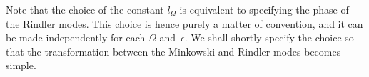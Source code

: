 
Note that the choice of the constant $l_{\Omega}$ is equivalent to
specifying the phase of the Rindler modes. This choice is hence purely
a matter of convention, and it can be made independently for each
$\Omega$ and~$\epsilon$. We shall shortly specify the choice so
that the transformation between the Minkowski and Rindler modes
becomes simple.


